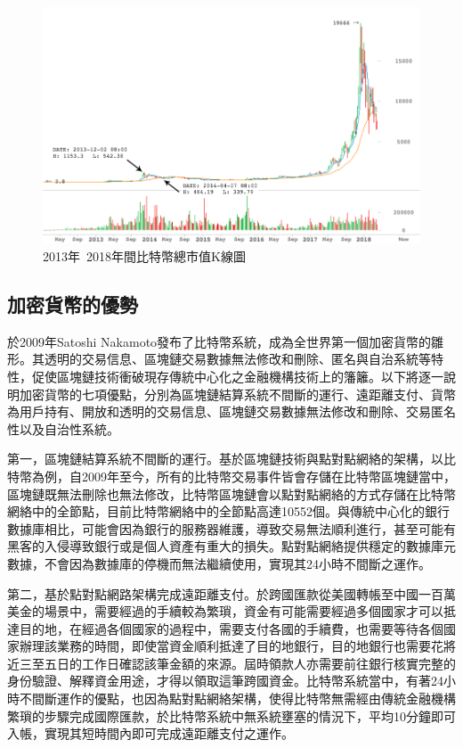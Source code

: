 			\begin{figure}[!htbp]
				\centering
				\includegraphics[width = 1\textwidth]{Thetotalmarketcapitalization.jpg}
				\caption{2013年~2018年間比特幣總市值K線圖\supercite{CryptocurrencyMarketCapitalizations}}\label{Thetotalmarketcapitalization}
			\end{figure}
		

			\subsection{加密貨幣的優勢}
			於2009年Satoshi Nakamoto發布了比特幣系統，成為全世界第一個加密貨幣的雛形。其透明的交易信息、區塊鏈交易數據無法修改和刪除、匿名與⾃治系統等特性，促使區塊鏈技術衝破現存傳統中⼼化之⾦融機構技術上的籓籬。以下將逐一說明加密貨幣的七項優點，分別為區塊鏈結算系統不間斷的運行、遠距離支付、貨幣為用戶持有、開放和透明的交易信息、區塊鏈交易數據無法修改和刪除、交易匿名性以及自治性系統。

				第一，區塊鏈結算系統不間斷的運行。基於區塊鏈技術與點對點網絡的架構，以比特幣為例，自2009年至今，所有的比特幣交易事件皆會存儲在比特幣區塊鏈當中，區塊鏈既無法刪除也無法修改，比特幣區塊鏈會以點對點網絡的方式存儲在比特幣網絡中的全節點\supercite{YouReallyShouldRunaBitcoinFullNode:HeresWhy}，目前比特幣網絡中的全節點高達10552個。與傳統中心化的銀行數據庫相比，可能會因為銀行的服務器維護，導致交易無法順利進行，甚至可能有黑客的入侵導致銀行或是個人資產有重大的損失。點對點網絡提供穩定的數據庫元數據，不會因為數據庫的停機而無法繼續使用，實現其24小時不間斷之運作。
				
				第二，基於點對點網路架構完成遠距離支付。於跨國匯款從美國轉帳至中國一百萬美金的場景中，需要經過的手續較為繁瑣，資金有可能需要經過多個國家才可以抵達目的地，在經過各個國家的過程中，需要支付各國的手續費，也需要等待各個國家辦理該業務的時間，即使當資金順利抵達了目的地銀行，目的地銀行也需要花將近三至五日的工作日確認該筆金額的來源。屆時領款人亦需要前往銀行核實完整的身份驗證、解釋資金用途，才得以領取這筆跨國資金。比特幣系統當中，有著24小時不間斷運作的優點，也因為點對點網絡架構，使得比特幣無需經由傳統金融機構繁瑣的步驟完成國際匯款，於比特幣系統中無系統壅塞的情況下，平均10分鐘即可入帳，實現其短時間內即可完成遠距離支付之運作。

